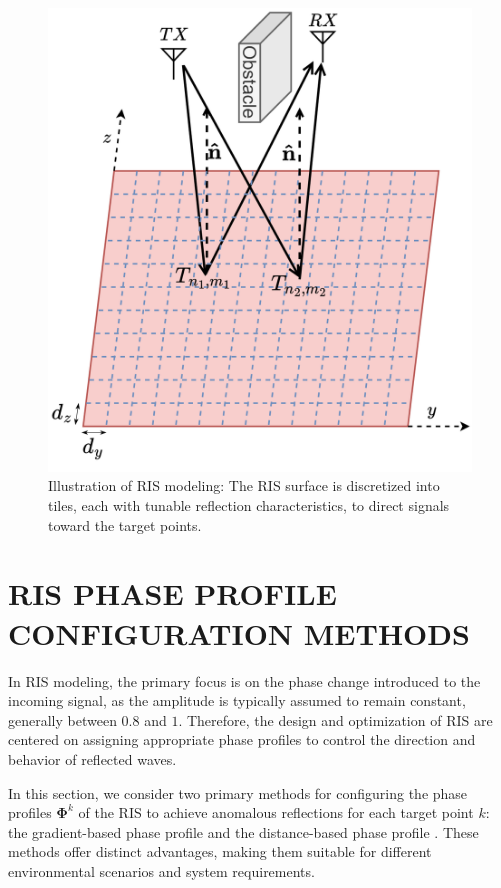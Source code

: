 \documentclass{IEEEoj}
\begin{document}
\begin{figure}
	\centering \includegraphics[width=.8\linewidth]{RIS_Modeling.png}
	\caption{Illustration of RIS modeling: The RIS surface is discretized into tiles, each with tunable reflection characteristics, to direct signals toward the target points.}
	\label{RIS_Modeling}
\end{figure}

\section{RIS PHASE PROFILE CONFIGURATION METHODS}
In RIS modeling, the primary focus is on the phase change introduced to the incoming signal, as the amplitude is typically assumed to remain constant, generally between $0.8$ and $1$. Therefore, the design and optimization of RIS are centered on assigning appropriate phase profiles to control the direction and behavior of reflected waves.

In this section, we consider two primary methods for configuring the phase profiles $\mathbf{\Phi}^k$ of the RIS to achieve anomalous reflections for each target point $k$: the gradient-based phase profile \cite{phase_grad_paper} and the distance-based phase profile \cite{Tang}. These methods offer distinct advantages, making them suitable for different environmental scenarios and system requirements.
\end{document}
